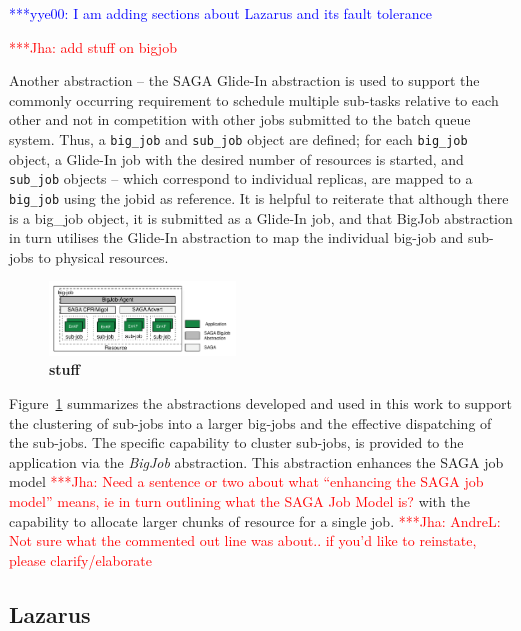 \documentclass[conference,final]{IEEEtran}
\newcommand{\jhanote}[1]{ {\textcolor{red} { ***Jha: #1 }}}
\newcommand{\yyenote}[1]{ {\textcolor{blue} { ***yye00: #1 }}}
\newcommand{\jhanote}[1]{}
\newcommand{\yyenote}[1]{}
\begin{document}
\yyenote{I am adding sections about Lazarus and its fault tolerance}

\jhanote{add stuff on bigjob}

Another abstraction
-- the SAGA Glide-In abstraction is used to support the commonly
occurring requirement to schedule multiple sub-tasks relative to each
other and not in competition with other jobs submitted to the batch
queue system.  Thus, a \texttt{big\_job} and \texttt{sub\_job} object
are defined; for each \texttt{big\_job} object, a Glide-In job with
the desired number of resources is started, and \texttt{sub\_job}
objects -- which correspond to individual replicas, are mapped to a
\texttt{big\_job} using the jobid as reference. It is helpful to
reiterate that although there is a big\_job object, it is submitted
as a Glide-In job, and that BigJob abstraction in turn utilises the
Glide-In abstraction to map the individual big-job and sub-jobs to
physical resources.

\begin{figure}[t]
      \centering
      \includegraphics[width=0.44\textwidth]{./figures/enkf_bigjob.pdf}
      \caption{\footnotesize \bf stuff }
      \label{fig:abstractions}
\end{figure}

Figure~\ref{fig:abstractions} summarizes the abstractions developed
and used in this work to support the clustering of sub-jobs into a
larger big-jobs and the effective dispatching of the sub-jobs.  The
specific capability to cluster sub-jobs, is provided to the
application via the \emph{BigJob} abstraction. This abstraction
enhances the SAGA job model \jhanote{Need a sentence or two about what
  ``enhancing the SAGA job model'' means, ie in turn outlining what
  the SAGA Job Model is?}  with the capability to allocate
larger chunks of resource for a single job.
\jhanote{AndreL: Not sure what the commented out line was about.. if
  you'd like to reinstate, please clarify/elaborate}

\subsection{Lazarus}
\end{document}
